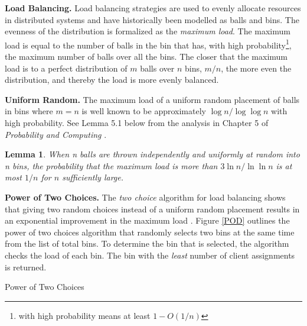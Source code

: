 \textbf{Load Balancing.} Load balancing strategies are used to evenly allocate resources in distributed systems and have historically been modelled as balls and bins\cite{mitzenmacher2005probability}. The evenness of the distribution is formalized as the \textit{maximum load}. The maximum load is equal to the number of balls in the bin that has, with high probability\footnote{with high probability means at least $1 - O(1/n)$}, the maximum number of balls over all the bins. The closer that the maximum load is to a perfect distribution of $m$ balls over $n$ bins, $m/n$, the more even the distribution, and thereby the load is more evenly balanced. 

\textbf{Uniform Random.} The maximum load of a uniform random placement of balls in bins where $m=n$ is well known to be approximately $\log n / \log \log n$ with high probability. \cite{gonnet1981expected}
See Lemma 5.1 below from the analysis in Chapter 5 of \textit{Probability and Computing} \cite{mitzenmacher2005probability}. 

\newtheorem{lemma}[theorem]{Lemma}

\begin{lemma} When n balls are thrown independently and uniformly at random into n bins, the probability that the maximum load is more than $3 \ln n / \ln \ln n$ is at most $1/n$ for $n$ sufficiently large.
\end{lemma}
\textbf{Power of Two Choices.} The \emph{two choice} algorithm for load balancing shows that giving two random choices instead of a uniform random placement results in an exponential improvement in the maximum load \cite{mitzenmacher1996power}. Figure \ref{POD} outlines the power of two choices algorithm that randomly selects two bins at the same time from the list of total bins. To determine the bin that is selected, the algorithm checks the load of each bin. The bin with the \emph{least} number of client assignments is returned. 

\begin{algorithm}[t]
\DontPrintSemicolon
{}
\caption{Power of Two Choices \label{POD}}
\end{algorithm}


